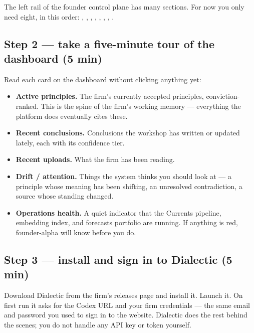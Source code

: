 \documentclass[11pt]{article}
\begin{document}
The left rail of the founder control plane has many sections. For now
you only need eight, in this order: , ,
, , , ,
, .


\subsection{Step 2 --- take a five-minute tour of the dashboard (5 min)}

Read each card on the dashboard without clicking anything yet:

\begin{itemize}[leftmargin=*,itemsep=0.2em]
  \item \textbf{Active principles.} The firm's currently accepted
        principles, conviction-ranked. This is the spine of the firm's
        working memory --- everything the platform does eventually
        cites these.
  \item \textbf{Recent conclusions.} Conclusions the workshop has
        written or updated lately, each with its confidence tier.
  \item \textbf{Recent uploads.} What the firm has been reading.
  \item \textbf{Drift / attention.} Things the system thinks you
        should look at --- a principle whose meaning has been shifting,
        an unresolved contradiction, a source whose standing changed.
  \item \textbf{Operations health.} A quiet indicator that the
        Currents pipeline, embedding index, and forecasts portfolio
        are running. If anything is red, founder-alpha will know
        before you do.
\end{itemize}

\subsection{Step 3 --- install and sign in to Dialectic (5 min)}

Download Dialectic from the firm's releases page and install it.
Launch it. On first run it asks for the Codex URL and your firm
credentials --- the same email and password you used to sign in to the
website. Dialectic does the rest behind the scenes; you do not handle
any API key or token yourself.
\end{document}
